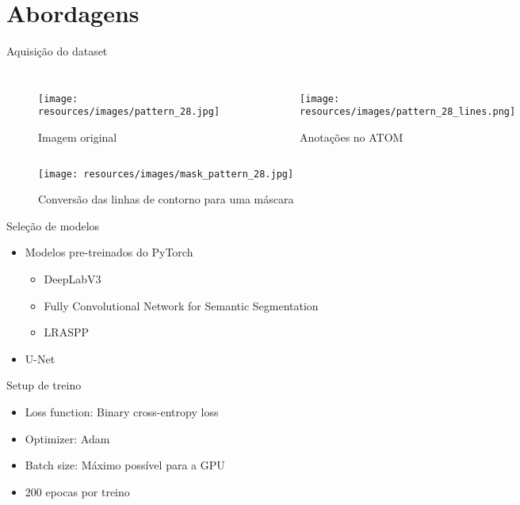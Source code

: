 \section{Abordagens}
\begin{frame}{Aquisição do dataset}
  
  \begin{columns}

      \begin{figure}[h]
          \centering
          \texttt{[image: resources/images/pattern\_28.jpg]}
          \captionsetup{labelformat=empty}
          \caption{Imagem original}
      \end{figure}

      \begin{figure}[h]
          \centering
          \texttt{[image: resources/images/pattern\_28\_lines.png]}
          \captionsetup{labelformat=empty}
          \caption{Anotações no ATOM}
      \end{figure}
  \end{columns}
      \vspace{\fill}
      \vspace{-0.2cm}



      \begin{figure}[h]
          \centering
          \texttt{[image: resources/images/mask\_pattern\_28.jpg]}
          \captionsetup{labelformat=empty}
          \caption{Conversão das linhas de contorno para uma máscara}
      \end{figure}
\end{frame}
\begin{frame}[c]{Seleção de modelos}{}

    \begin{itemize}
          \item Modelos pre-treinados do PyTorch
          \begin{itemize}
            \item DeepLabV3
            \item Fully Convolutional Network for Semantic Segmentation
            \item LRASPP
          \end{itemize}
          \item U-Net
    \end{itemize}

\end{frame}

\begin{frame}{Setup de treino}
  \begin{itemize}
    \item Loss function: Binary cross-entropy loss
    \item Optimizer: Adam
    \item Batch size: Máximo possível para a GPU
    \item 200 epocas por treino
  \end{itemize}
  
\end{frame}